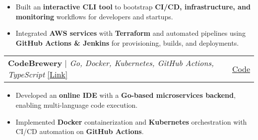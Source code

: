 \documentclass[letterpaper,11pt]{article}
\makeatletter
\newcommand{\resumeItem}[1]{
  \item\small{
    {#1 \vspace{-2pt}}
  }
}
\newcommand{\resumeProjectHeading}[2]{
    \item
    \begin{tabular*}{0.97\textwidth}{l@{\extracolsep{\fill}}r}
      \small#1 & #2 \\
    \end{tabular*}\vspace{-7pt}
}
\newcommand{\resumeItemListStart}{\begin{itemize}}
\newcommand{\resumeItemListEnd}{\end{itemize}\vspace{-5pt}}
\makeatother
\begin{document}
\resumeItemListStart
    \resumeItem{Built an \textbf{interactive CLI tool} to bootstrap \textbf{CI/CD, infrastructure, and monitoring} workflows for developers and startups.}
    \resumeItem{Integrated \textbf{AWS services} with \textbf{Terraform} and automated pipelines using \textbf{GitHub Actions \& Jenkins} for provisioning, builds, and deployments.}
\resumeItemListEnd

\vspace{-4pt}

\resumeProjectHeading
{\textbf{CodeBrewery} $|$ \footnotesize\emph{Go, Docker, Kubernetes, GitHub Actions, TypeScript} \href{https://codebrewery.vercel.app}{[\underline{Link}]}}{\faIcon{github}\href{https://github.com/slashexx/CodeBrewery}{ \underline{Code}}}

\resumeItemListStart
    \resumeItem{Developed an \textbf{online IDE} with a \textbf{Go-based microservices backend}, enabling multi-language code execution.}
    \resumeItem{Implemented \textbf{Docker} containerization and \textbf{Kubernetes} orchestration with CI/CD automation on \textbf{GitHub Actions}.}
\resumeItemListEnd





\end{document}
